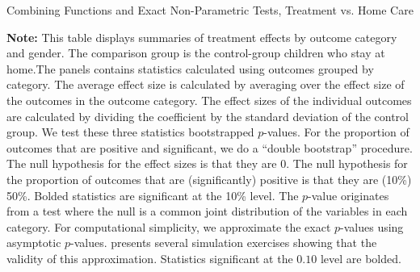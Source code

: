 \begin{table}[!htpb]
\begin{threeparttable}
\caption{Combining Functions and Exact Non-Parametric Tests, Treatment vs. Home Care} \label{table:massivehome}
\centering
  
\begin{tablenotes}
\footnotesize
\item  \scriptsize \textbf{Note:} This table displays summaries of treatment effects by outcome category and gender. The comparison group is the control-group children who stay at home.The panels contains statistics calculated using outcomes grouped by category. The average effect size is calculated by averaging over the effect size of the outcomes in the outcome category. The effect sizes of the individual outcomes are calculated by dividing the coefficient by the standard deviation of the control group. We test these three statistics bootstrapped $p$-values. For the proportion of outcomes that are positive and significant, we do a ``double bootstrap'' procedure. The null hypothesis for the effect sizes is that they are 0. The null hypothesis for the proportion of outcomes that are (significantly) positive is that they are (10\%) 50\%. Bolded statistics are significant at the 10\% level. The \citet{Rosenbaum_2005_Distribution_JRSS} $p$-value originates from a test where the null is a common joint distribution of the variables in each category. For computational simplicity, we approximate the exact $p$-values using asymptotic $p$-values. \citet{Rosenbaum_2005_Distribution_JRSS} presents several simulation exercises showing that the validity of this approximation. Statistics significant at the $0.10$ level are bolded.
\end{tablenotes}
\end{threeparttable}
\end{table}

